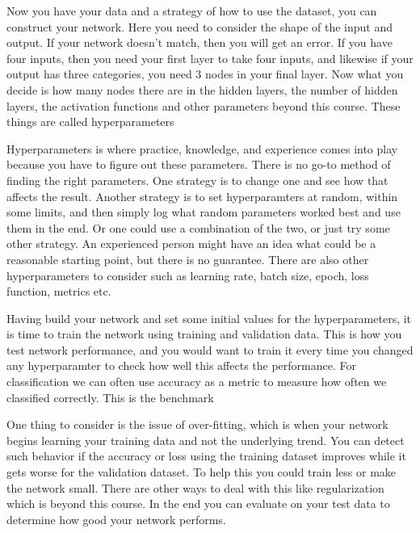\documentclass[11pt,a4paper]{article} %
\numberwithin{equation}{section}
\begin{document}
    	Now you have your data and a strategy of how to use the dataset, you can construct your network. Here you need to consider the shape of the input and output. If your network doesn't match, then you will get an error. If you have four inputs, then you need your first layer to take four inputs, and likewise if your output has three categories, you need 3 nodes in your final layer. Now what you decide is how many nodes there are in the hidden layers, the number of hidden layers, the activation functions and other parameters beyond this course. These things are called hyperparameters
    	
    	Hyperparameters is where practice, knowledge, and experience comes into play because you have to figure out these parameters. There is no go-to method of finding the right parameters. One strategy is to change one and see how that affects the result. Another strategy is to set hyperparamters at random, within some limits, and then simply log what random parameters worked best and use them in the end. Or one could use a combination of the two, or just try some other strategy. An experienced person might have an idea what could be a reasonable starting point, but there is no guarantee. There are also other hyperparameters to consider such as learning rate, batch size, epoch, loss function, metrics etc.
    	
    	Having build your network and set some initial values for the hyperparameters, it is time to train the network using training and validation data. This is how you test network performance, and you would want to train it every time you changed any hyperparamter to check how well this affects the performance. For classification we can often use accuracy as a metric to measure how often we classified correctly. This is the benchmark
    	
    	One thing to consider is the issue of over-fitting, which is when your network begins learning your training data and not the underlying trend. You can detect such behavior if the accuracy or loss using the training dataset improves while it gets worse for the validation dataset. To help this you could train less or make the network small. There are other ways to deal with this like regularization which is beyond this course. In the end you can evaluate on your test data to determine how good your network performs.
    	
    	
\end{document}

